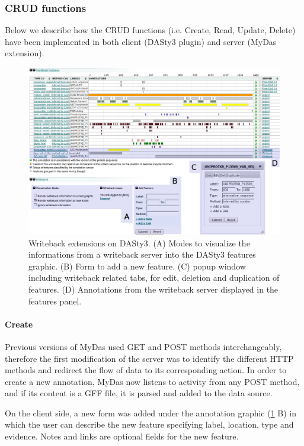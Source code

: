 \subsubsection{CRUD functions}
Below we describe how the CRUD functions (i.e. Create, Read, Update, Delete) have been implemented in both client (DASty3 plugin) and server (MyDas extension).

\begin{figure}[ht]
\centering
\includegraphics[width=6.5in]{figures/dasty3wbT.png} 
\caption{Writeback extensions on DASty3. (A) Modes to visualize the informations from a writeback server into the DASty3 features graphic. (B) Form to add a new feature. (C) popup window including writeback related tabs, for edit, deletion and duplication of features. (D) Annotations from the writeback server displayed in the features panel.}  \label{fig: dasty+wb}
\end{figure}

\paragraph{Create}
Previous versions of MyDas used GET and POST methods interchangeably, therefore the first modification of the server was to identify the different HTTP methods and redirect the flow of data to its corresponding action. In order to create a new annotation, MyDas now listens to activity from any POST method, and if its content is a GFF file, it is parsed and added to the data source. 

On the client side, a new form was added under the annotation graphic (\ref{fig: dasty+wb} B) in which the user can describe the new feature specifying label, location, type and evidence. Notes and links are optional fields for the new feature. 

